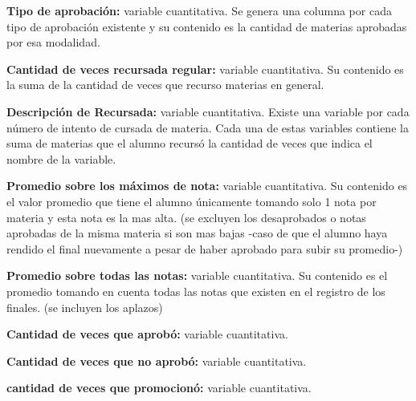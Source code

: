 \textbf{Tipo de aprobación:} variable cuantitativa. Se genera una columna por cada tipo de aprobación existente y su contenido es la cantidad de materias aprobadas por esa modalidad.

\vspace{3mm}

\textbf{Cantidad de veces recursada regular:} variable cuantitativa. Su contenido es la suma de la cantidad de veces que recurso materias en general.

\vspace{3mm}

\textbf{Descripción de Recursada:} variable cuantitativa. Existe una variable por cada número de intento de cursada de materia. Cada una de estas variables contiene la suma de materias que el alumno recursó la cantidad de veces que indica el nombre de la variable.

\vspace{3mm}

\textbf{Promedio sobre los máximos de nota:} variable cuantitativa. Su contenido es el valor promedio que tiene el alumno únicamente tomando solo 1 nota por materia y esta nota es la mas alta. (se excluyen los desaprobados o notas aprobadas de la misma materia si son mas bajas -caso de que el alumno haya rendido el final nuevamente a pesar de haber aprobado para subir su promedio-)

\vspace{3mm}

\textbf{Promedio sobre todas las notas:} variable cuantitativa. Su contenido es el promedio tomando en cuenta todas las notas que existen en el registro de los finales. (se incluyen los aplazos)

\vspace{3mm}

\textbf{Cantidad de veces que aprobó:} variable cuantitativa.

\vspace{3mm}

\textbf{Cantidad de veces que no aprobó:} variable cuantitativa.

\vspace{3mm}

\textbf{cantidad de veces que promocionó:} variable cuantitativa.

\vspace{3mm}





